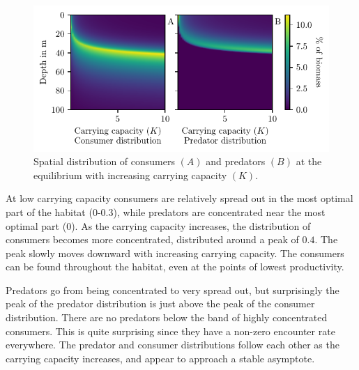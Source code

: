 \begin{figure}[H]
  \caption{Spatial distribution of consumers $(A)$ and predators $(B)$ at the equilibrium with increasing carrying capacity $(K)$.}
  \label{fig:strat_car}
  \includegraphics{plots/increasing_car_cap_c.pdf}
\end{figure}

At low carrying capacity consumers are relatively spread out in the most optimal part of the habitat (0-0.3), while predators are concentrated near the most optimal part (0). As the carrying capacity increases, the distribution of consumers becomes more concentrated, distributed around a peak of $0.4$. The peak slowly moves downward with increasing carrying capacity. The consumers can be found throughout the habitat, even at the points of lowest productivity.


Predators go from being concentrated to very spread out, but surprisingly the peak of the predator distribution is just above the peak of the consumer distribution. There are no predators below the band of highly concentrated consumers. This is quite surprising since they have a non-zero encounter rate everywhere. The predator and consumer distributions follow each other as the carrying capacity increases, and appear to approach a stable asymptote.






